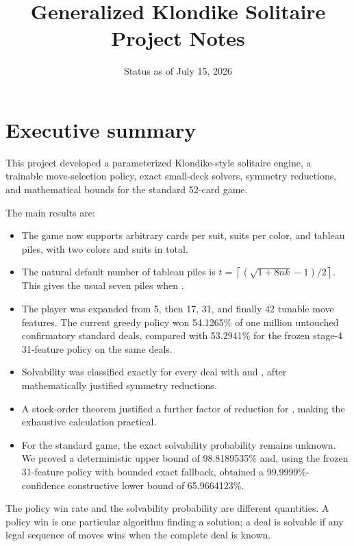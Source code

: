 \documentclass[11pt]{article}
\title{Generalized Klondike Solitaire\\\large Project Notes}
\author{}
\date{Status as of July 15, 2026}
\begin{document}
\maketitle
\tableofcontents
\newpage

\section{Executive summary}

This project developed a parameterized Klondike-style solitaire engine, a trainable move-selection policy, exact small-deck solvers, symmetry reductions, and mathematical bounds for the standard 52-card game.

The main results are:

\begin{itemize}
  \item The game now supports arbitrary \texttt{} cards per suit, \texttt{} suits per color, and \texttt{} tableau piles, with two colors and \texttt{} suits in total.
  \item The natural default number of tableau piles is $t=\left\lceil(\sqrt{1+8nk}-1)/2\right\rceil$. This gives the usual seven piles when \texttt{}.
  \item The player was expanded from 5, then 17, 31, and finally 42 tunable move features. The current greedy policy won 54.1265\% of one million untouched confirmatory standard deals, compared with 53.2941\% for the frozen stage-4 31-feature policy on the same deals.
  \item Solvability was classified exactly for every deal with \texttt{} and \texttt{}, after mathematically justified symmetry reductions.
  \item A stock-order theorem justified a further factor of \texttt{} reduction for \texttt{}, making the exhaustive calculation practical.
  \item For the standard game, the exact solvability probability remains unknown. We proved a deterministic upper bound of 98.8189535\% and, using the frozen 31-feature policy with bounded exact fallback, obtained a 99.9999\%-confidence constructive lower bound of 65.9664123\%.
\end{itemize}

The policy win rate and the solvability probability are different quantities. A policy win is one particular algorithm finding a solution; a deal is solvable if any legal sequence of moves wins when the complete deal is known.
\end{document}
